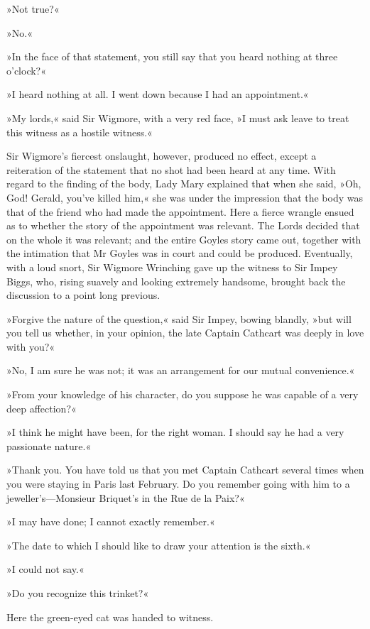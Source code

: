 »Not true?«

»No.«

»In the face of that statement, you still say that you heard nothing at three o'clock?«

»I heard nothing at all. I went down because I had an appointment.«

»My lords,« said Sir Wigmore, with a very red face, »I must ask leave to treat this witness as a hostile witness.«

Sir Wigmore's fiercest onslaught, however, produced no effect, except a reiteration of the statement that no shot had been heard at any time. With regard to the finding of the body, Lady Mary explained that when she said, »Oh, God! Gerald, you've killed him,« she was under the impression that the body was that of the friend who had made the appointment. Here a fierce wrangle ensued as to whether the story of the appointment was relevant. The Lords decided that on the whole it was relevant; and the entire Goyles story came out, together with the intimation that Mr Goyles was in court and could be produced.  Eventually, with a loud snort, Sir Wigmore Wrinching gave up the witness to Sir Impey Biggs, who, rising suavely and looking extremely handsome, brought back the discussion to a point long previous.

»Forgive the nature of the question,« said Sir Impey, bowing blandly, »but will you tell us whether, in your opinion, the late Captain Cathcart was deeply in love with you?«

»No, I am sure he was not; it was an arrangement for our mutual convenience.«

»From your knowledge of his character, do you suppose he was capable of a very deep affection?«

»I think he might have been, for the right woman. I should say he had a very passionate nature.«

»Thank you. You have told us that you met Captain Cathcart several times when you were staying in Paris last February. Do you remember going with him to a jeweller's—Monsieur Briquet's in the Rue de la Paix?«

»I may have done; I cannot exactly remember.«

»The date to which I should like to draw your attention is the sixth.«

»I could not say.«

»Do you recognize this trinket?«

Here the green-eyed cat was handed to witness.

